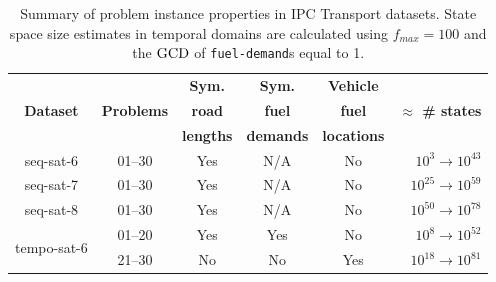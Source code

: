 \begin{table}[tb]
\centering
\begin{tabular}{cccccr}
\toprule
\multirow{3}{*}{\textbf{Dataset}} & \multirow{3}{*}{\textbf{Problems}} & \textbf{Sym.} & \textbf{Sym.} & \textbf{Vehicle} & \multirow{3}{*}{\textbf{$\approx$ \# states}}\\
& &  \textbf{road} & \textbf{fuel} & \textbf{fuel} &\\
& & \textbf{lengths} & \textbf{demands} & \textbf{locations} &\\
\midrule
seq-sat-6 & 01--30 & Yes & N/A & No & $10^{3} \to 10^{43}$\\
seq-sat-7 & 01--30 & Yes & N/A & No & $10^{25} \to 10^{59}$\\
seq-sat-8 & 01--30 & Yes & N/A & No & $10^{50} \to 10^{78}$\\\midrule
\multirow{2}{*}{tempo-sat-6} & 01--20 & Yes & Yes & No & $10^{8} \to 10^{52}$\\
& 21--30 & No & No & Yes & $10^{18} \to 10^{81}$\\
\bottomrule
\end{tabular} 
\caption[Summary of problem instance properties in IPC Transport datasets.]{Summary of problem instance properties in IPC Transport datasets.
State space size estimates in temporal domains
are calculated using $f_{max} = 100$ and the $\textrm{GCD}$ of \texttt{fuel-demand}s equal to 1.}
\label{tab:problem-properties}
\end{table}

